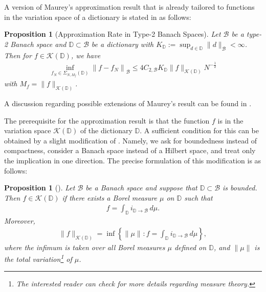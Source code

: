 \documentclass[a4paper]{article}
\newcommand{\norm}[2]{\|#1\|_{#2}}
\numberwithin{equation}{section}
\newtheorem{proposition}[theorem]{Proposition}
\theoremstyle{remark}
\begin{document}
A version of Maurey's approximation result
that is already tailored to functions
in the variation space of a dictionary is stated in \cite{Siegel22SharpBoundsApproximation} as follows:
\begin{proposition}[Approximation Rate in Type-2 Banach Spaces]
\label{prop:approximation_type2}
    Let $\mathcal{B}$ be a type-2 Banach space
    and $\mathbb{D} \subset \mathcal{B}$ be a dictionary
    with $K_{\mathbb{D}}:=\sup _{d \in \mathbb{D}}\|d\|_{\mathcal{B}}<\infty$.
    Then for $f \in \mathcal{K}(\mathbb{D})$, we have
    \begin{align*}
        \inf_{f_N \in \Sigma_{N, M_f}(\mathbb{D})}\left\|f-f_N\right\|_{\mathcal{B}}
        \leq 4 C_{2,\mathcal{B}} K_{\mathbb{D}}\norm{f}{\mathcal{K}(\mathbb{D})} N^{-\frac{1}{2}}
    \end{align*}
    with $M_f=\norm{f}{\mathcal{K}(\mathbb{D})}$.
\end{proposition}
A discussion regarding possible extensions of Maurey's result
can be found in 
\cite[Section 8]{DeVore98NonlinearApproximation}.

The prerequisite for the approximation result is that
the function $f$ is in the variation space $\mathcal{K}(\mathbb{D})$
of the dictionary $\mathbb{D}$.
A sufficient condition for this can be obtained by a slight modification of \cite[Lemma 3]{Siegel23CharacterizationVariationSpaces}.
Namely, we ask for boundedness instead of compactness,
consider a Banach space instead of a Hilbert space,
and treat only the implication in one direction.
The precise formulation of this modification is as follows:
\begin{proposition}[{\cite[Lemma 3]{Siegel23CharacterizationVariationSpaces}}]
\label{prop:variation_norm}
    Let $\mathcal{B}$ be a Banach space and suppose that $\mathbb{D}\subset\mathcal{B}$ is bounded.
    Then $f\in\mathcal{K}(\mathbb{D})$ if there
    exists a Borel measure $\mu$ on $\mathbb{D}$ such that
    \begin{align*}
        f=\int_{\mathbb{D}}i_{\mathbb{D}\to\mathcal{B}}\,d \mu.
    \end{align*}
    Moreover,
    \begin{align*}
        \norm{f}{\mathcal{K}(\mathbb{D})}
        =\inf\left\{\norm{\mu}{}:
        f=\int_\mathbb{D}i_{\mathbb{D}\to\mathcal{B}}\,d \mu\right\},
    \end{align*}
    where the infimum is taken over all Borel measures $\mu$
    defined on $\mathbb{D}$, and $\| \mu\|$ is the total variation\footnote{The interested reader can check \cite{Cohn13MeasureTheorySecond} for more details regarding measure theory.} of $\mu$. 
\end{proposition}
\end{document}
